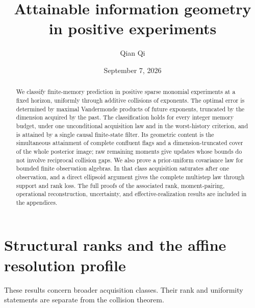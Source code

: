 \documentclass[11pt]{amsart}
\title[Attainable information geometry]{Attainable information geometry\\ in positive experiments}
\author{Qian Qi}
\date{September 7, 2026}
\theoremstyle{definition}\newtheorem{definition}[theorem]{Definition}
\theoremstyle{remark}\newtheorem{remark}[theorem]{Remark}
\begin{document}
\begin{abstract}
We classify finite-memory prediction in positive sparse monomial
experiments at a fixed horizon, uniformly through additive collisions of
exponents. The optimal error is determined by maximal Vandermonde
products of future exponents, truncated by the dimension acquired by the
past. The classification holds for every integer memory budget, under
one unconditional acquisition law and in the worst-history criterion,
and is attained by a single causal finite-state filter. Its geometric
content is the simultaneous attainment of complete confluent flags and
a dimension-truncated cover of the whole posterior image; raw remaining
moments give updates whose bounds do not involve reciprocal collision
gaps. We also prove a prior-uniform covariance law for bounded finite
observation algebras. In that class acquisition saturates after one
observation, and a direct ellipsoid argument gives the complete
multistep law through support and rank loss. The full proofs of the
associated rank, moment-pairing, operational reconstruction, uncertainty,
and effective-realization results are included in the appendices.
\end{abstract}
\maketitle












\appendix
\section{Structural ranks and the affine resolution profile}
\label{app:structural}
These results concern broader acquisition classes. Their rank and
uniformity statements are separate from the collision theorem.
\begingroup
\let\section\subsection
\let\subsection\subsubsection
\let\subsubsection\paragraph


\endgroup
\end{document}
